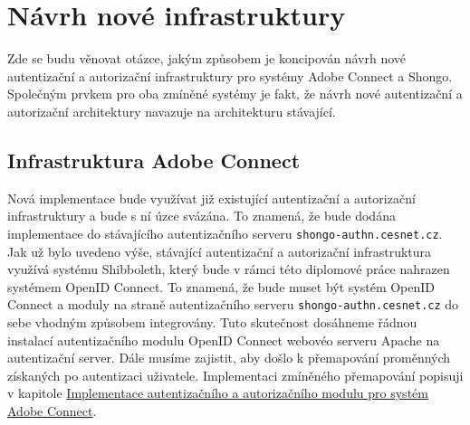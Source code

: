 \documentclass[
  printed, %
  twoside, %
  table,   %
  nolof,     %
  nolot,     %
]{fithesis3}
\begin{document}
\section{Návrh nové infrastruktury}
Zde se budu věnovat otázce, jakým způsobem je koncipován návrh nové autentizační a autorizační infrastruktury pro systémy Adobe Connect a Shongo. Společným prvkem pro oba zmíněné systémy je fakt, že návrh nové autentizační a autorizační architektury navazuje na architekturu stávající. 

\subsection{Infrastruktura Adobe Connect}
Nová implementace bude využívat již existující autentizační a autorizační infrastruktury a bude s ní úzce svázána. To znamená, že bude dodána implementace do stávajícího autentizačního serveru \texttt{shongo-authn.cesnet.cz}. Jak už bylo uvedeno výše, stávající autentizační a autorizační infrastruktura využívá systému Shibboleth, který bude v rámci této diplomové práce nahrazen systémem OpenID Connect. To znamená, že bude muset být systém OpenID Connect a moduly na straně autentizačního serveru \texttt{shongo-authn.cesnet.cz} do sebe vhodným způsobem integrovány. Tuto skutečnost dosáhneme řádnou instalací  autentizačního modulu OpenID Connect webovéo serveru Apache na autentizační server. Dále musíme zajistit, aby došlo k přemapování proměnných získaných po autentizaci uživatele. Implementaci zmíněného přemapování popisuji v kapitole \hyperref[ACImpl]{Implementace autentizačního a autorizačního modulu pro systém Adobe Connect}. 
\end{document}
